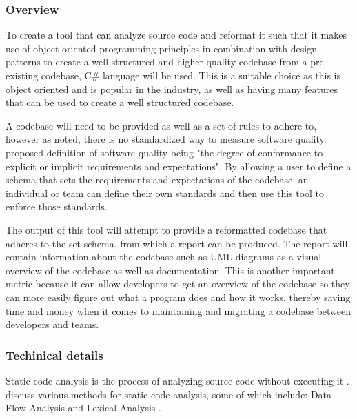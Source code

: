 
\subsubsection{Overview}
To create a tool that can analyze source code and reformat it such that it makes use of object oriented programming principles in combination with design patterns to create a well structured and higher quality codebase from a pre-existing codebase, C\# language will be used. This is a suitable choice as this is object oriented and is popular in the industry, as well as having many features that can be used to create a well structured codebase.

A codebase will need to be provided as well as a set of rules to adhere to, however as noted, there is no standardized way to measure software quality. \cite{8681007} proposed definition of software quality being "the degree of conformance to explicit or implicit requirements and expectations". By allowing a user to define a schema that sets the requirements and expectations of the codebase, an individual or team can define their own standards and then use this tool to enforce those standards.

The output of this tool will attempt to provide a reformatted codebase that adheres to the set schema, from which a report can be produced. The report will contain information about the codebase such as UML diagrams as a visual overview of the codebase as well as documentation. This is another important metric because it can allow developers to get an overview of the codebase so they can more easily figure out what a program does and how it works, thereby saving time and money when it comes to maintaining and migrating a codebase between developers and teams.

\subsubsection{Techinical details}
Static code analysis is the process of analyzing source code without executing it \citep{8802820}. \cite{owasp/StaticCodeAnalysis} discuss various methods for static code analysis, some of which include: Data Flow Analysis \citep{owasp/StaticCodeAnalysis} and Lexical Analysis \citep{owasp/StaticCodeAnalysis}.

